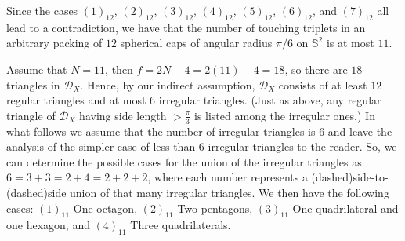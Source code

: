 \documentclass[10pt]{article}
\numberwithin{Subcase}{Case}
\begin{document}


Since the cases $(1)_{12}$, $(2)_{12}$, $(3)_{12}$, $(4)_{12}$, $(5)_{12}$, $(6)_{12}$, and $(7)_{12}$ all lead to a contradiction, we have that the number of touching triplets in an arbitrary packing of $12$ spherical caps of angular radius $\pi/6$ on $\mathbb{S}^2$ is at most $11$.

Assume that $N=11$, then $f=2N-4=2(11)-4=18$, so there are $18$ triangles in $\mathcal{D}_{X}$. Hence, by our indirect assumption, $\mathcal{D}_{X}$ consists of at least $12$ regular triangles and at most $6$ irregular triangles. (Just as above, any regular triangle of $\mathcal{D}_{X}$ having side length $>\frac{\pi}{3}$ is listed among the irregular ones.) In what follows we assume that the number of irregular triangles is $6$ and leave the analysis of the simpler case of less than $6$ irregular triangles to the reader. So, we can determine the possible cases for the union of the irregular triangles as $6=3+3=2+4=2+2+2$, where each number represents a (dashed)side-to-(dashed)side union of that many irregular triangles. We then have the following cases: $(1)_{11}$ One octagon, $(2)_{11}$ Two pentagons, $(3)_{11}$ One quadrilateral and one hexagon, and $(4)_{11}$ Three quadrilaterals.
\end{document}
